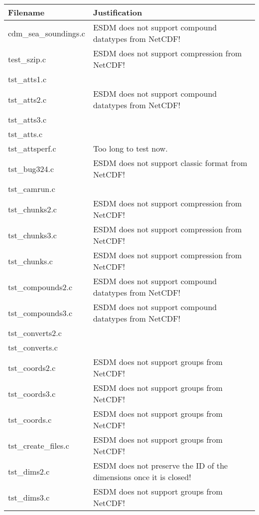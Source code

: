 \begin{table}[H]
\centering
\begin{tabular}{|l|l|}
\hline
Filename & Justification \\ \hline \hline
cdm\_sea\_soundings.c   & ESDM does not support compound datatypes from NetCDF!          \\ \hline
test\_szip.c   &  ESDM does not support compression from NetCDF!         \\ \hline
tst\_atts1.c   &           \\ \hline
tst\_atts2.c   &  ESDM does not support compound datatypes from NetCDF!         \\ \hline
tst\_atts3.c   &           \\ \hline
tst\_atts.c   &           \\ \hline
tst\_attsperf.c   &  Too long to test now.         \\ \hline
tst\_bug324.c   &  ESDM does not support classic format from NetCDF!         \\ \hline
tst\_camrun.c   &           \\ \hline
tst\_chunks2.c   &  ESDM does not support compression from NetCDF!         \\ \hline
tst\_chunks3.c   & ESDM does not support compression from NetCDF!       \\ \hline
tst\_chunks.c   &  ESDM does not support compression from NetCDF!       \\ \hline
tst\_compounds2.c   &  ESDM does not support compound datatypes from NetCDF!         \\ \hline
tst\_compounds3.c   &  ESDM does not support compound datatypes from NetCDF!         \\ \hline
tst\_converts2.c   &           \\ \hline
tst\_converts.c   &           \\ \hline
tst\_coords2.c   &   ESDM does not support groups from NetCDF!       \\ \hline
tst\_coords3.c   &  ESDM does not support groups from NetCDF!         \\ \hline
tst\_coords.c   &  ESDM does not support groups from NetCDF!         \\ \hline
tst\_create\_files.c   &   ESDM does not support groups from NetCDF!        \\ \hline
tst\_dims2.c   & ESDM does not preserve the ID of the dimensions once it is closed!       \\ \hline
tst\_dims3.c   & ESDM does not support groups from NetCDF!      \\ \hline

\end{tabular}
\end{table}
